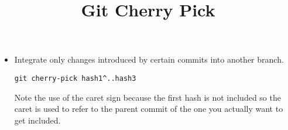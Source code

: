 \documentclass{../template/texnote}
\title{Git Cherry Pick}
\begin{document}
    \maketitle {}
	\begin{itemize}
	\item Integrate only changes introduced by certain commits into another branch.

	\verb|git cherry-pick hash1^..hash3|

		Note the use of the caret sign because the first hash is not included so the caret is used to refer to the parent commit of the one you actually want to get included.
	\end{itemize}
    \printbibliography
\end{document}
